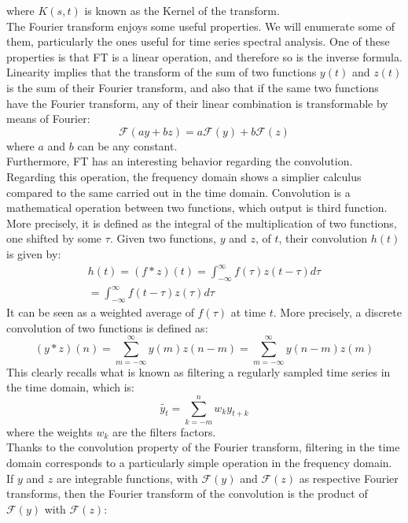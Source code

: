 \documentclass{article}
\begin{document}
where $K(s,t)$ is known as the Kernel of the transform.
\\The Fourier transform enjoys some useful properties. We will enumerate some of them, particularly the ones useful for time series spectral analysis. One of these properties is that FT is a linear operation, and therefore so is the inverse formula. Linearity implies that the transform of the sum of two functions $y(t)$ and $z(t)$ is the sum of their Fourier transform, and also that if the same two functions have the Fourier transform, any of their linear combination is transformable by means of Fourier:
\begin{equation}
\mathcal{F}(ay+bz)=a\mathcal{F}(y)+b\mathcal{F}(z)
\end{equation}
where $a$ and $b$ can be any constant.\\Furthermore, FT has an interesting behavior regarding the convolution. Regarding this operation, the frequency domain shows a simplier calculus compared to the same carried out in the time domain. Convolution is a mathematical operation between two functions, which output is third function. More precisely, it is defined as the integral of the multiplication of two functions, one shifted by some $\tau$. Given two functions, $y$ and $z$, of $t$, their convolution $h(t)$ is given by:
\begin{align*}
h(t)=(f\ast z)(t)=\int_{-\infty}^{\infty}f(\tau)z(t-\tau)d\tau \\= \int_{-\infty}^{\infty}f(t-\tau)z(\tau)d\tau
\end{align*}
It can be seen as a weighted average of $f(\tau)$ at time $t$. More precisely, a discrete convolution of two functions is defined as:
\begin{equation}
(y*z)(n)=\sum_{m=-\infty}^{\infty}y(m)z(n-m)=\sum_{m=-\infty}^{\infty}y(n-m)z(m)
\end{equation}
This clearly recalls what is known as filtering a regularly sampled time series in the time domain, which is:
\begin{equation}
\tilde{y_t}=\sum_{k=-m}^{n}w_k y_{t+k}
\end{equation}
where the weights $w_k$ are the filters factors.\\Thanks to the convolution property of the Fourier transform, filtering in the time domain corresponds to a particularly simple operation in the frequency domain. If $y$ and $z$ are integrable functions, with $\mathcal{F}(y)$ and $\mathcal{F}(z)$ as respective Fourier transforms, then the Fourier transform of the convolution is the product of $\mathcal{F}(y)$ with  $\mathcal{F}(z)$:
\end{document}
